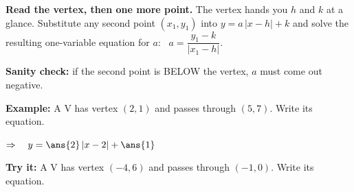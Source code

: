 \documentclass[12pt]{article}
\begin{document}

\begin{formulabox}
\textbf{Read the vertex, then one more point.} The vertex hands you $h$ and $k$ at a glance. Substitute any second point $(x_1, y_1)$ into $y = a\,|x - h| + k$ and solve the resulting one-variable equation for $a$: \ $a = \dfrac{y_1 - k}{|x_1 - h|}$.\par
\textbf{Sanity check:} if the second point is BELOW the vertex, $a$ must come out negative.
\end{formulabox}

\begin{examplebox}
\textbf{Example:} \quad A V has vertex $(2, 1)$ and passes through $(5, 7)$. Write its equation.

$\Rightarrow\quad y = \ans{2}\,|x - 2| + \ans{1}$
\end{examplebox}

\begin{tryitbox}
\textbf{Try it:} \quad A V has vertex $(-4, 6)$ and passes through $(-1, 0)$. Write its equation.\\[2pt]
\end{tryitbox}
\end{document}
